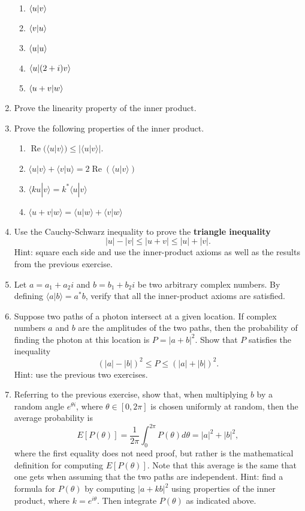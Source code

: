 \documentclass [12pt]{article}
\theoremstyle{definition}
\begin{document}
\begin{enumerate}
\begin{enumerate}
\item $\braket{u|v}$
\item $\braket{v|u}$
\item $\braket{u|u}$
\item $\braket{u|(2+i)v}$
\item $\braket{u+v|w}$
\end{enumerate}


\item Prove the linearity property of the inner product. 

\item Prove the following properties of the inner product.

\begin{enumerate}
\item $\operatorname{Re}(\langle u|v\rangle)\leq |\langle u|v \rangle|$.
\item $\langle u|v\rangle + \langle v|u\rangle = 2\operatorname{Re}(\langle u|v\rangle)$
\item $\langle ku|v\rangle = k^* \langle u|v\rangle$
\item $\langle u+v|w\rangle = \langle u|w\rangle + \langle v|w\rangle$
\end{enumerate}


\item Use the Cauchy-Schwarz inequality to prove the \textbf{triangle inequality}
\[|u|-|v| \leq |u+v|\leq |u| + |v|.\]
Hint: square each side and use the inner-product axioms as well as the results from the previous exercise.

\item Let $a=a_1+a_2i$ and $b=b_1+b_2i$ be two arbitrary complex numbers. By defining $\langle a|b\rangle=a^*b$, verify that all the inner-product axioms are satisfied.

\item Suppose two paths of a photon intersect at a given location. If complex numbers $a$ and $b$ are the amplitudes
of the two paths, then the probability of finding the photon at this location is $P=|a+b|^2$. Show that $P$ satisfies the inequality 
\[(|a|-|b|)^2 \leq P \leq (|a|+|b|)^2.\]
Hint: use the previous two exercises.

\item 
Referring to the previous exercise,
show that, when multiplying $b$ by a random angle $e^{\theta i}$, where $\theta\in [0,2\pi]$ is chosen uniformly at random, then the average probability 
is 
\[E[P(\theta)]=\frac{1}{2\pi}\int_0^{2\pi} P(\theta)d\theta =|a|^2 + |b|^2,\]
where the first equality does not need proof, but rather is the mathematical definition for computing $E[P(\theta)]$.
 Note that this average is the same that one gets  when assuming that the two paths are independent. Hint: find a formula for $P(\theta)$ by computing
 $|a+kb|^2$ using properties of the inner product,
where $k=e^{i\theta}$. Then integrate $P(\theta)$ as indicated above.


\end{enumerate}
\end{document}
